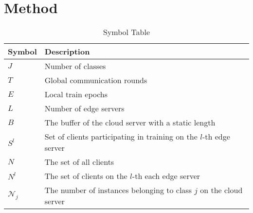 \documentclass[journal]{IEEEtran}
\begin{document}
\section{Method}
\begin{table}[H]
  \caption{Symbol Table}
  \centering
  \renewcommand{\arraystretch}{1.2}
  \begin{tabular}{|@{}m{1cm}<{\centering}|m{6.5cm}|}
    \hline
    \textbf{Symbol}                       & \textbf{Description}                                                                                                                  \\
    \hline
    \( J \)                               & Number of classes                                                                                                                     \\
    \hline
    \( T \)                               & Global communication rounds                                                                                                                         \\
    \hline
     \( E \)                               & Local train epochs                                                                                                                          \\
    \hline
     \( L \)                               & Number of edge servers                                                                                                                \\
    \hline
     \( B \)                               & The buffer of the cloud server with a static length                                                                                   \\
    \hline
    \( S^{l} \)                           & Set of clients participating in training on the \( l \)-th edge server                                                                \\
    \hline
     \( N \)                             & The set of all clients                                                                                  \\
    \hline
     \( N^l \)                             & The set of clients on the $l$-th each edge server                                                                                      \\
    \hline
    \(\mathcal{N}_{j}\) & The number of instances belonging to class \( j \) on the cloud server \\ 

\end{tabular}
\end{table}
\end{document}

